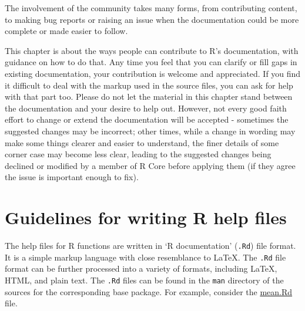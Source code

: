 \documentclass[
]{book}
\begin{document}
The involvement of the community takes many forms, from contributing content, to making bug reports or raising an issue when the documentation could be more complete or made easier to follow.

This chapter is about the ways people can contribute to R's documentation, with guidance on how to do that. Any time you feel that you can clarify or fill gaps in existing documentation, your contribution is welcome and appreciated. If you find it difficult to deal with the markup used in the source files, you can ask for help with that part too. Please do not let the material in this chapter stand between the documentation and your desire to help out. However, not every good faith effort to change or extend the documentation will be accepted - sometimes the suggested changes may be incorrect; other times, while a change in wording may make some things clearer and easier to understand, the finer details of some corner case may become less clear, leading to the suggested changes being declined or modified by a member of R Core before applying them (if they agree the issue is important enough to fix).

\hypertarget{guidelines-for-writing-r-help-files}{%
\section{Guidelines for writing R help files}\label{guidelines-for-writing-r-help-files}}

The help files for R functions are written in `R documentation' (\texttt{.Rd}) file format. It is a simple markup language with close resemblance to LaTeX. The \texttt{.Rd} file format can be further processed into a variety of formats, including LaTeX, HTML, and plain text. The \texttt{.Rd} files can be found in the \texttt{man} directory of the sources for the corresponding base package. For example, consider the \href{https://svn.r-project.org/R/trunk/src/library/base/man/mean.Rd}{mean.Rd} file.
\end{document}
